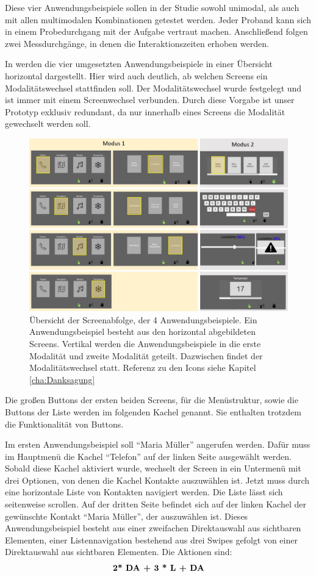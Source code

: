 Diese vier Anwendungsbeispiele sollen in der Studie sowohl unimodal, als auch mit allen multimodalen Kombinationen getestet werden. 
Jeder Proband kann sich in einem Probedurchgang mit der Aufgabe vertraut machen.
Anschließend folgen zwei Messdurchgänge, in denen die Interaktionszeiten erhoben werden. 

In  werden die vier umgesetzten Anwendungsbeispiele in einer Übersicht horizontal dargestellt. 
Hier wird auch deutlich, ab welchen Screens ein Modalitätswechsel stattfinden soll. 
Der Modalitätswechsel wurde festgelegt und ist immer mit einem Screenwechsel verbunden. 
Durch diese Vorgabe ist unser Prototyp exklusiv redundant, da nur innerhalb eines Screens die Modalität gewechselt werden soll. 
\begin{figure}[ht]
  \centering
  \includegraphics[width=1\textwidth]{img/UseCases2.jpg}
  \caption[Übersicht der Screenabfolge, der 4 Anwendungsbeispiele.]{Übersicht der Screenabfolge, der 4 Anwendungsbeispiele. Ein Anwendungsbeispiel besteht aus den horizontal abgebildeten Screens. Vertikal werden die Anwendungsbeispiele in die erste Modalität und zweite Modalität geteilt. Dazwischen findet der Modalitätswechsel statt. Referenz zu den Icons siehe Kapitel \ref{cha:Danksagung}}
  \label{fig:UseCases}
\end{figure}
Die großen Buttons der ersten beiden Screens, für die Menüstruktur, sowie die Buttons der Liste werden im folgenden Kachel genannt. 
Sie enthalten trotzdem die Funktionalität von Buttons. 

Im ersten Anwendungsbeispiel soll "`Maria Müller"' angerufen werden. Dafür muss im Hauptmenü die Kachel "`Telefon"' auf der linken Seite ausgewählt werden. 
Sobald diese Kachel aktiviert wurde, wechselt der Screen in ein Untermenü mit drei Optionen, von denen die Kachel Kontakte auszuwählen ist. 
Jetzt muss durch eine horizontale Liste von Kontakten navigiert werden. 
Die Liste lässt sich seitenweise scrollen. 
Auf der dritten Seite befindet sich auf der linken Kachel der gewünschte Kontakt "`Maria Müller"', der auszuwählen ist. 
Dieses Anwendungsbeispiel besteht aus einer zweifachen Direktauswahl aus sichtbaren Elementen, einer Listennavigation bestehend aus drei Swipes gefolgt von einer Direktauswahl aus sichtbaren Elementen. 
Die Aktionen sind:
$$\textbf{2* \text{DA} + 3 * \text{L} + \text{DA}}$$

